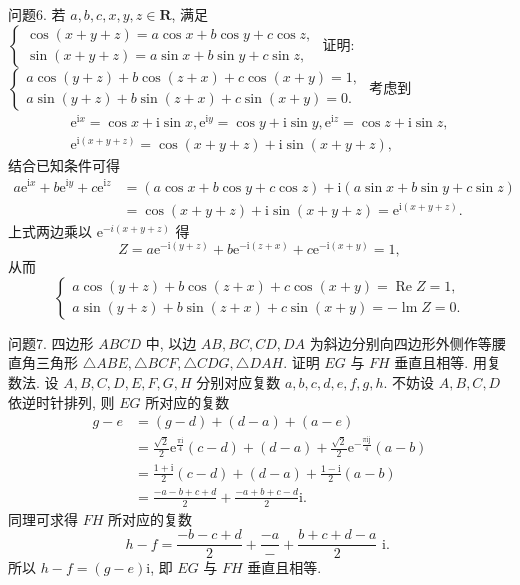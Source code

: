 问题6. 若 $a, b, c, x, y, z \in \mathbf{R}$, 满足 $\left\{\begin{array}{l}\cos (x+y+z)=a \cos x+b \cos y+c \cos z, \\ \sin (x+y+z)=a \sin x+b \sin y+c \sin z,\end{array}\right.$ 证明: $\left\{\begin{array}{l}a \cos (y+z)+b \cos (z+x)+c \cos (x+y)=1, \\ a \sin (y+z)+b \sin (z+x)+c \sin (x+y)=0 .\end{array}\right.$
考虑到
$$
\begin{gathered}
\mathrm{e}^{\mathrm{i} x}=\cos x+\mathrm{i} \sin x, \mathrm{e}^{\mathrm{i} y}=\cos y+\mathrm{i} \sin y, \mathrm{e}^{\mathrm{i} z}=\cos z+\mathrm{i} \sin z, \\
\mathrm{e}^{\mathrm{i}(x+y+z)}=\cos (x+y+z)+\mathrm{i} \sin (x+y+z),
\end{gathered}
$$
结合已知条件可得
$$
\begin{aligned}
a \mathrm{e}^{\mathrm{i} x}+b \mathrm{e}^{\mathrm{i} y}+c \mathrm{e}^{\mathrm{i} z} & =(a \cos x+b \cos y+c \cos z)+\mathrm{i}(a \sin x+b \sin y+c \sin z) \\
& =\cos (x+y+z)+\mathrm{i} \sin (x+y+z)=\mathrm{e}^{\mathrm{i}(x+y+z)} .
\end{aligned}
$$
上式两边乘以 $\mathrm{e}^{-i(x+y+z)}$ 得
$$
Z=a \mathrm{e}^{-\mathrm{i}(y+z)}+b \mathrm{e}^{-\mathrm{i}(z+x)}+c \mathrm{e}^{-\mathrm{i}(x+y)}=1,
$$
从而
$$
\left\{\begin{array}{l}
a \cos (y+z)+b \cos (z+x)+c \cos (x+y)=\operatorname{Re} Z=1, \\
a \sin (y+z)+b \sin (z+x)+c \sin (x+y)=-\operatorname{lm} Z=0 .
\end{array}\right.
$$



问题7. 四边形 $A B C D$ 中, 以边 $A B, B C, C D, D A$ 为斜边分别向四边形外侧作等腰直角三角形 $\triangle A B E, \triangle B C F, \triangle C D G, \triangle D A H$. 证明 $E G$ 与 $F H$ 垂直且相等.
用复数法.
设 $A, B, C, D, E, F, G, H$ 分别对应复数 $a, b, c, d, e, f, g, h$. 不妨设 $A, B, C, D$ 依逆时针排列, 则 $E G$ 所对应的复数
$$
\begin{aligned}
g-e & =(g-d)+(d-a)+(a-e) \\
& =\frac{\sqrt{2}}{2} \mathrm{e}^{\frac{\pi \mathrm{i}}{4}}(c-d)+(d-a)+\frac{\sqrt{2}}{2} \mathrm{e}^{-\frac{\pi \mathrm{ij}}{4}}(a-b) \\
& =\frac{1+\mathrm{i}}{2}(c-d)+(d-a)+\frac{1-\mathrm{i}}{2}(a-b) \\
& =\frac{-a-b+c+d}{2}+\frac{-a+b+c-d}{2} \mathrm{i} .
\end{aligned}
$$
同理可求得 $F H$ 所对应的复数
$$
h-f=\frac{-b-c+d}{2}+\frac{-a}{-}+\frac{b+c+d-a}{2} \text { i. }
$$
所以 $h-f=(g-e) \mathrm{i}$, 即 $E G$ 与 $F H$ 垂直且相等.



